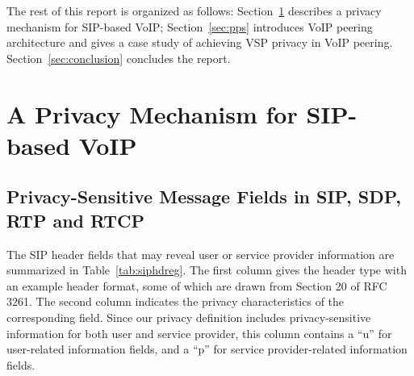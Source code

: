 \documentclass[letterpaper,notitlepage,times,12pt]{article}
\begin{document}
The rest of this report is organized as follows: Section~\ref{sec:voipprivacy} describes a privacy mechanism for SIP-based VoIP; Section~\ref{sec:pps} introduces VoIP peering architecture and gives a case study of achieving VSP privacy in VoIP peering. Section~\ref{sec:conclusion} concludes the report.











\section{A Privacy Mechanism for SIP-based VoIP} \label{sec:voipprivacy}





\subsection{Privacy-Sensitive Message Fields in SIP, SDP, RTP and RTCP} \label{sec:privacyfield}

The SIP header fields that may reveal user or service provider information are summarized in Table~\ref{tab:siphdreg}. The first column gives the header type with an example header format, some of which are drawn from Section 20 of RFC 3261. The second column indicates the privacy characteristics of the corresponding field. Since our privacy definition includes privacy-sensitive information for both user and service provider, this column contains a ``u'' for user-related information fields, and a ``p'' for service provider-related information fields.
\end{document}
